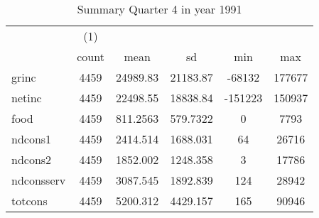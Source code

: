 \begin{table}[htbp]\centering
\def\sym#1{\ifmmode^{#1}\else\(^{#1}\)\fi}
\caption{Summary Quarter 4 in year 1991 \label{sum\_Q4\_y1991}}
\begin{tabular}{l*{1}{ccccc}}
\hline\hline
            &\multicolumn{1}{c}{(1)}&            &            &            &            \\
            &       count&        mean&          sd&         min&         max\\
\hline
grinc       &        4459&    24989.83&    21183.87&      -68132&      177677\\
netinc      &        4459&    22498.55&    18838.84&     -151223&      150937\\
food        &        4459&    811.2563&    579.7322&           0&        7793\\
ndcons1     &        4459&    2414.514&    1688.031&          64&       26716\\
ndcons2     &        4459&    1852.002&    1248.358&           3&       17786\\
ndconsserv  &        4459&    3087.545&    1892.839&         124&       28942\\
totcons     &        4459&    5200.312&    4429.157&         165&       90946\\
\hline\hline
\end{tabular}
\end{table}
